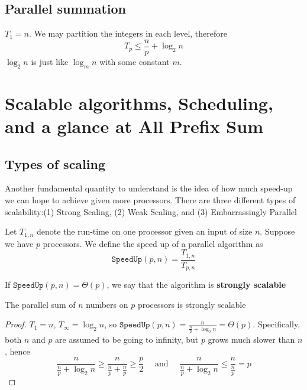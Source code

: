 \documentclass[11pt]{article}
\begin{document}
\subsection{Parallel summation}
\label{sec:org8c7ceb8}
\(T_1=n\). We may partition the integers in each level, therefore
\begin{equation*}
T_p\le\frac{n}{p}+\log_2n
\end{equation*}
\(\log_2n\) is just like \(\log_mn\) with some constant \(m\).
\section{Scalable algorithms, Scheduling, and a glance at All Prefix Sum}
\label{sec:org846260a}
\subsection{Types of scaling}
\label{sec:org79334a4}
Another fundamental quantity to understand is the idea of how much speed-up we can hope to
achieve given more processors. There are three different types of scalability:(1) Strong
Scaling, (2) Weak Scaling, and (3) Embarrassingly Parallel

Let \(T_{1,n}\) denote the run-time on one processor given an input of size \(n\). Suppose we
have \(p\) processors. We define the speed up of a parallel algorithm as
\begin{equation*}
\texttt{SpeedUp}(p,n)=\frac{T_{1,n}}{T_{p,n}}
\end{equation*}

\begin{definition}
If \(\texttt{SpeedUp}(p,n)=\Theta(p)\), we say that the algorithm is \textbf{strongly scalable}
\end{definition}

\begin{proposition}[]
The parallel sum of \(n\) numbers on \(p\) processors is strongly scalable
\end{proposition}

\begin{proof}
\(T_1=n\), \(T_\infty=\log_2n\), so \(\texttt{SpeedUp}(p,n)=\frac{n}{\frac{n}{p}+\log_2n}=\Theta(p)\).
Specifically, both \(n\) and \(p\) are assumed to be going to infinity, but \(p\) grows much
slower than \(n\), hence
\begin{equation*}
\frac{n}{\frac{n}{p}+\log_2n}\ge\frac{n}{\frac{n}{p}+\frac{n}{p}}\ge\frac{p}{2}
\quad\text{ and }\quad
\frac{n}{\frac{n}{p}+\log_2n}\le\frac{n}{\frac{n}{p}}=p
\end{equation*}
\end{proof}
\end{document}
